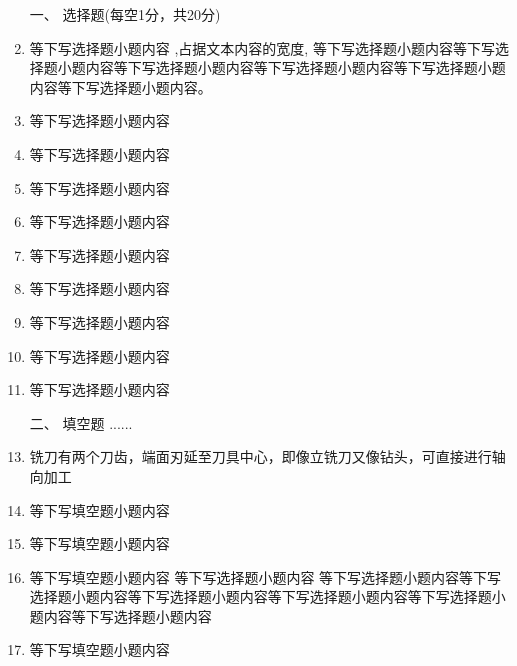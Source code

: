 \documentclass[12pt,landscape,UTF8,onecolumn]{ctexart}
\begin{document}
  \begin{spacing}{1.3}
    \begin{enumerate} [1、]
      \item[\heiti 一、] {\heiti 选择题(每空1分，共20分)}
      \item 等下写选择题小题\tk[5]内容 \hphantom{文本内容},占据文本内容的宽度,\phantom{文本内容}	
      等下写选择题小题内容等下写选择题小题内容等下写选择题小题内容等下\tk 写选择题小题内容等下写选择题小题内容等下写选择题小题内容。
      \item 等下写选择题小题内容 
      \item 等下写选择题小题内容 
      \item 等下写选择题小题内容 
      \item 等下写选择题小题内容 
      \item 等下写选择题小题内容 
      \item 等下写选择题小题内容 
      \item 等下写选择题小题内容 
      \item 等下写选择题小题内容 
      \item 等下写选择题小题内容 

      \item[\heiti 二、] { \heiti 填空题  ...... }
      \item \tk{}铣刀有两个刀齿，端面刃延至刀具中心，即像立铣刀又像钻头，可直接进行轴向加工 \pd
      \item 等下写填空题小题内容 \pd
      \item 等下写填空题小题内容 \pd
      \item 等下写填空题小题内容 等下写选择题小题内容 等下写选择题小题内容等下写选择题小题内容等下写选择题小题内容等下写选择题小题内容等下写选择题小题内容等下写选择题小题内容\pd
      \item 等下写填空题小题内容 \pd


\end{enumerate}
\end{spacing}
\end{document}

